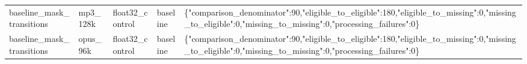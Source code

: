 \documentclass{article}
\begin{document}
\begin{landscape}
\begin{longtable}{L{3.5cm}L{3.0cm}L{3.0cm}L{2.8cm}L{9.0cm}}
baseline\_\allowbreak{}mask\_\allowbreak{}transitions & mp3\_\allowbreak{}128k & float32\_\allowbreak{}control & baseline & \{"comparison\_\allowbreak{}denominator":\allowbreak{}90,\allowbreak{}"eligible\_\allowbreak{}to\_\allowbreak{}eligible":\allowbreak{}180,\allowbreak{}"eligible\_\allowbreak{}to\_\allowbreak{}missing":\allowbreak{}0,\allowbreak{}"missing\_\allowbreak{}to\_\allowbreak{}eligible":\allowbreak{}0,\allowbreak{}"missing\_\allowbreak{}to\_\allowbreak{}missing":\allowbreak{}0,\allowbreak{}"processing\_\allowbreak{}failures":\allowbreak{}0\}\\
baseline\_\allowbreak{}mask\_\allowbreak{}transitions & opus\_\allowbreak{}96k & float32\_\allowbreak{}control & baseline & \{"comparison\_\allowbreak{}denominator":\allowbreak{}90,\allowbreak{}"eligible\_\allowbreak{}to\_\allowbreak{}eligible":\allowbreak{}180,\allowbreak{}"eligible\_\allowbreak{}to\_\allowbreak{}missing":\allowbreak{}0,\allowbreak{}"missing\_\allowbreak{}to\_\allowbreak{}eligible":\allowbreak{}0,\allowbreak{}"missing\_\allowbreak{}to\_\allowbreak{}missing":\allowbreak{}0,\allowbreak{}"processing\_\allowbreak{}failures":\allowbreak{}0\}\\
\end{longtable}
\end{landscape}
\end{document}
